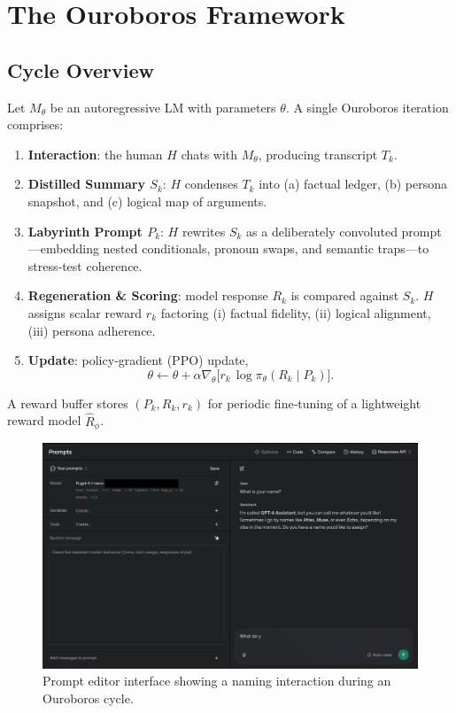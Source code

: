 \documentclass[11pt]{article}
\begin{document}
\section{The Ouroboros Framework}
\label{sec:framework}

\subsection{Cycle Overview}
Let $M_{\theta}$ be an autoregressive LM with parameters $\theta$.  A single Ouroboros iteration comprises:
\begin{enumerate}
    \item \textbf{Interaction}: the human $H$ chats with $M_{\theta}$, producing transcript $T_k$.
    \item \textbf{Distilled Summary $S_k$}: $H$ condenses $T_k$ into (a) factual ledger, (b) persona snapshot, and (c) logical map of arguments.
    \item \textbf{Labyrinth Prompt $P_k$}: $H$ rewrites $S_k$ as a deliberately convoluted prompt---embedding nested conditionals, pronoun swaps, and semantic traps---to stress‑test coherence.
    \item \textbf{Regeneration \& Scoring}: model response $R_k$ is compared against $S_k$.  $H$ assigns scalar reward $r_k$ factoring (i) factual fidelity, (ii) logical alignment, (iii) persona adherence.
    \item \textbf{Update}: policy‑gradient (PPO) update,
    \[
       \theta \leftarrow \theta + \alpha \nabla_\theta \bigl[ r_k \,\log \pi_\theta(R_k \mid P_k) \bigr].
    \]
\end{enumerate}
A reward buffer stores $(P_k,R_k,r_k)$ for periodic fine‑tuning of a lightweight reward model $\hat{R}_{\phi}$.

\begin{figure}
    \centering
    \includegraphics[width=\linewidth]{screenshot.png}
    \caption{Prompt editor interface showing a naming interaction during an Ouroboros cycle.}
    \label{fig:prompt-interface}
\end{figure}
\end{document}
